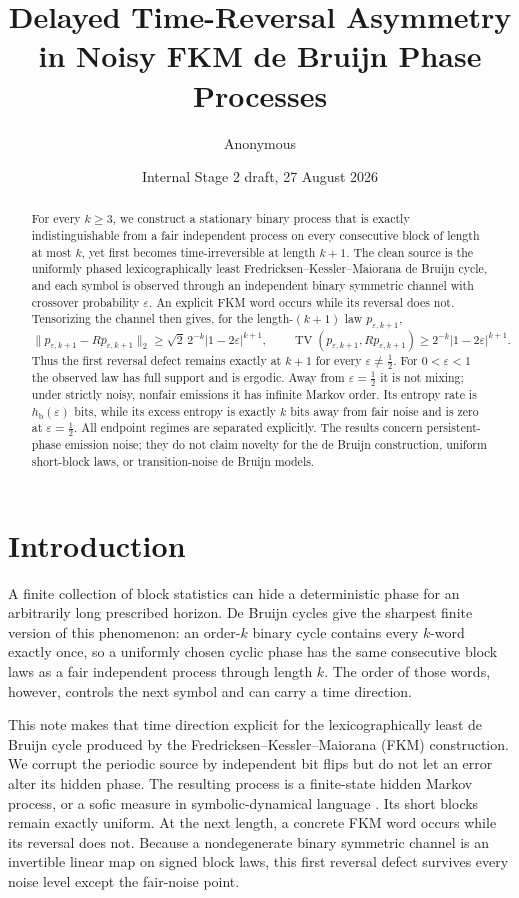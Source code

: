 \documentclass[11pt,a4paper]{amsart}
\title[Delayed irreversibility in noisy FKM processes]{Delayed Time-Reversal Asymmetry in Noisy FKM de Bruijn Phase Processes}
\author{Anonymous}
\date{Internal Stage 2 draft, 27 August 2026}
\theoremstyle{definition}
\theoremstyle{remark}
\newcommand{\TV}{\operatorname{TV}}
\newcommand{\hb}{h_{\mathrm b}}
\begin{document}
\begin{abstract}
For every $k\geq 3$, we construct a stationary binary process that is exactly
indistinguishable from a fair independent process on every consecutive block
of length at most $k$, yet first becomes time-irreversible at length $k+1$.
The clean source is the uniformly phased lexicographically least
Fredricksen--Kessler--Maiorana de Bruijn cycle, and each symbol is observed
through an independent binary symmetric channel with crossover probability
$\varepsilon$.  An explicit FKM word occurs while its reversal does not.
Tensorizing the channel then gives, for the length-$(k+1)$ law
$p_{\varepsilon,k+1}$,
\[
 \|p_{\varepsilon,k+1}-Rp_{\varepsilon,k+1}\|_2
 \geq \sqrt{2}\,2^{-k}|1-2\varepsilon|^{k+1},
 \qquad
 \TV(p_{\varepsilon,k+1},Rp_{\varepsilon,k+1})
 \geq 2^{-k}|1-2\varepsilon|^{k+1}.
\]
Thus the first reversal defect remains exactly at $k+1$ for every
$\varepsilon\neq \tfrac12$.  For $0<\varepsilon<1$ the observed law has full
support and is ergodic.  Away from $\varepsilon=\tfrac12$ it is not mixing;
under strictly noisy, nonfair emissions it has infinite Markov order.  Its entropy rate is
$\hb(\varepsilon)$ bits, while its excess entropy is exactly $k$ bits away
from fair noise and is zero at $\varepsilon=\tfrac12$.
All endpoint regimes are separated explicitly.  The results concern
persistent-phase emission noise; they do not claim novelty for the de Bruijn
construction, uniform short-block laws, or transition-noise de Bruijn models.
\end{abstract}

\maketitle

\section{Introduction}

A finite collection of block statistics can hide a deterministic phase for
an arbitrarily long prescribed horizon.  De Bruijn cycles give the sharpest
finite version of this phenomenon: an order-$k$ binary cycle contains every
$k$-word exactly once, so a uniformly chosen cyclic phase has the same
consecutive block laws as a fair independent process through length $k$.
The order of those words, however, controls the next symbol and can carry a
time direction.

This note makes that time direction explicit for the lexicographically least
de Bruijn cycle produced by the Fredricksen--Kessler--Maiorana (FKM)
construction.  We corrupt the periodic source by independent bit flips but
do not let an error alter its hidden phase.  The resulting process is a
finite-state hidden Markov process, or a sofic measure in symbolic-dynamical
language \cite{BoylePetersen2010}.  Its short blocks remain exactly uniform.
At the next length, a concrete FKM word occurs while its reversal does not.
Because a nondegenerate binary symmetric channel is an invertible linear map
on signed block laws, this first reversal defect survives every noise level
except the fair-noise point.
\end{document}
